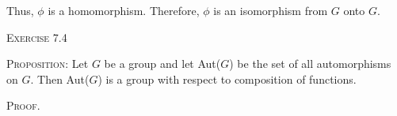 \documentclass[12pt, a4paper]{article}
\begin{document}
\vspace{4mm}

    Thus, $\phi$ is a homomorphism. Therefore, $\phi$ is an isomorphism from $G$ onto $G$.
    
\vspace{4mm}

\begin{flushleft}
    \textsc{Exercise 7.4}
\end{flushleft}

    \textsc{Proposition: }Let $G$ be a group and let Aut($G$) be the set of all automorphisms on $G$. Then Aut($G$) is a group with respect to composition of functions.
    
\vspace{4mm}

    \textsc{Proof. }\par
    
\vspace{4mm}
\end{document}
